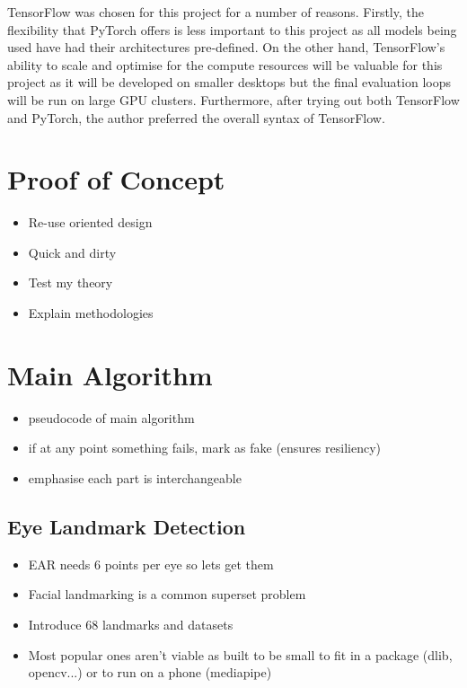 TensorFlow was chosen for this project for a number of reasons. Firstly, the flexibility that PyTorch offers is less important to this project as all models being used have had their architectures pre-defined. On the other hand, TensorFlow's ability to scale and optimise for the compute resources will be valuable for this project as it will be developed on smaller desktops but the final evaluation loops will be run on large GPU clusters. Furthermore, after trying out both TensorFlow and PyTorch, the author preferred the overall syntax of TensorFlow.

\section{Proof of Concept}

\begin{itemize}
    \item Re-use oriented design
    \item Quick and dirty
    \item Test my theory
    \item Explain methodologies
\end{itemize}

\section{Main Algorithm}

\begin{itemize}
    \item pseudocode of main algorithm
    \item if at any point something fails, mark as fake (ensures resiliency)
    \item emphasise each part is interchangeable
\end{itemize}

\subsection{Eye Landmark Detection}

\begin{itemize}
    \item EAR needs 6 points per eye so lets get them
    \item Facial landmarking is a common superset problem
    \item Introduce 68 landmarks and datasets
    \item Most popular ones aren't viable as built to be small to fit in a package (dlib, opencv...) or to run on a phone (mediapipe)
\end{itemize}

